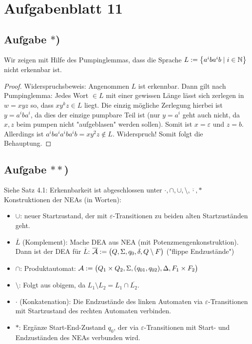 
\section{Aufgabenblatt 11}
\subsection*{Aufgabe $\ast$)}
Wir zeigen mit Hilfe des Pumpinglemmas, dass die Sprache $L:=\big\lbrace a^i ba^ib\mid i\in\mathbb{N}\big\rbrace$ nicht erkennbar ist.

\begin{proof}
	Widerspruchsbeweis: Angenommen $L$ ist erkennbar. Dann gilt nach Pumping\-lemma:
	Jedes Wort $\in L$ mit einer gewissen Länge lässt sich zerlegen in $w=xyz$ so, dass $xy^k z\in L$ liegt.
	Die einzig mögliche Zerlegung hierbei ist $y=a^iba^i$, da dies der einzige pumpbare Teil ist (nur $y=a^i$ geht auch nicht, da $x,z$ beim pumpen nicht "aufgeblasen" werden sollen).
	Somit ist $x=\varepsilon$ und $z=b$.
	Allerdings ist $a^iba^ia^ib a^ib=xy^2z\not\in L$.
	Widerspruch! Somit folgt die Behauptung.
\end{proof}

\subsection*{Aufgabe $\ast\ast$)}
Siehe Satz 4.1: 
Erkennbarkeit ist abgeschlossen unter $\cdot,\cap,\cup,\setminus,\overline{\cdot},\ast$
Konstruktionen der NEAs (in Worten):
\begin{itemize}
	\item $\cup$: neuer Startzustand, der mit $\varepsilon$-Transitionen zu beiden alten Startzuständen geht.
	\item $\overline{L}$ (Komplement): Mache DEA aus NEA (mit Potenzmengenkonstruktion).
	Dann ist der DEA für $\overline{L}$: $\overline{\mathcal{A}}:=\big(Q,\Sigma,q_0,\delta,Q\setminus F\big)$ ("flippe Endzustände")
	\item $\cap$: Produktautomat: $\mathcal{A}:=\big(Q_1\times Q_2,\Sigma,(q_{01},q_{02}),\Delta,F_1\times F_2\big)$
	\item $\setminus$: Folgt aus obigem, da $L_1\setminus L_2=L_1\cap\overline{L_2}$.
	\item $\cdot$ (Konkatenation): Die Endzustände des linken Automaten via $\varepsilon$-Transitionen mit Startzustand des rechten Automaten verbinden.
	\item $\ast$: Ergänze Start-End-Zustand $q_0$, der via $\varepsilon$-Transitionen mit Start- und Endzuständen des NEAs verbunden wird.
\end{itemize}

